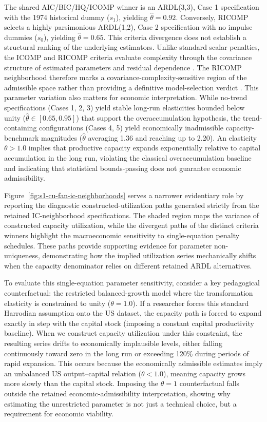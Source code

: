\documentclass[11pt]{article}
\begin{document}
The shared AIC/BIC/HQ/ICOMP winner is an ARDL(3,3), Case 1 specification with the 1974 historical dummy (\(s_1\)), yielding \(\hat{\theta}=0.92\). Conversely, RICOMP selects a highly parsimonious ARDL(1,2), Case 2 specification with no impulse dummies (\(s_0\)), yielding \(\hat{\theta}=0.65\). This criteria divergence does not establish a structural ranking of the underlying estimators. Unlike standard scalar penalties, the ICOMP and RICOMP criteria evaluate complexity through the covariance structure of estimated parameters and residual dependence \citep{Bozdogan1990,Bozdogan2000}. The RICOMP neighborhood therefore marks a covariance-complexity-sensitive region of the admissible space rather than providing a definitive model-selection verdict \citep{GuneyBozdoganArslan2021}. This parameter variation also matters for economic interpretation. While no-trend specifications (Cases 1, 2, 3) yield stable long-run elasticities bounded below unity ($\hat{\theta} \in [0.65, 0.95]$) that support the overaccumulation hypothesis, the trend-containing configurations (Cases 4, 5) yield economically inadmissible capacity-benchmark magnitudes ($\hat{\theta}$ averaging 1.36 and reaching up to 2.20). An elasticity $\theta > 1.0$ implies that productive capacity expands exponentially relative to capital accumulation in the long run, violating the classical overaccumulation baseline and indicating that statistical bounds-passing does not guarantee economic admissibility.

Figure~\ref{fig:s1-cu-fan-ic-neighborhoods} serves a narrower evidentiary role by reporting the diagnostic constructed-utilization paths generated strictly from the retained IC-neighborhood specifications. The shaded region maps the variance of constructed capacity utilization, while the divergent paths of the distinct criteria winners highlight the macroeconomic sensitivity to single-equation penalty schedules. These paths provide supporting evidence for parameter non-uniqueness, demonstrating how the implied utilization series mechanically shifts when the capacity denominator relies on different retained ARDL alternatives.

To evaluate this single-equation parameter sensitivity, consider a key pedagogical counterfactual: the restricted balanced-growth model where the transformation elasticity is constrained to unity ($\theta = 1.0$). If a researcher forces this standard Harrodian assumption onto the US dataset, the capacity path is forced to expand exactly in step with the capital stock (imposing a constant capital productivity baseline). When we construct capacity utilization under this constraint, the resulting series drifts to economically implausible levels, either falling continuously toward zero in the long run or exceeding 120\% during periods of rapid expansion. This occurs because the economically admissible estimates imply an unbalanced US output--capital relation ($\theta < 1.0$), meaning capacity grows more slowly than the capital stock. Imposing the $\theta=1$ counterfactual falls outside the retained economic-admissibility interpretation, showing why estimating the unrestricted parameter is not just a technical choice, but a requirement for economic viability.
\end{document}
